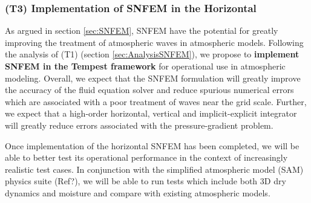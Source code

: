 \documentclass[11pt]{article}
\begin{document}


\subsubsection{(T3) Implementation of SNFEM in the Horizontal} \label{sec:HorizontalSNFEM}

As argued in section \ref{sec:SNFEM}, SNFEM have the potential for greatly improving the treatment of atmospheric waves in atmospheric models.  Following the analysis of (T1) (section \ref{sec:AnalysisSNFEM}), we propose to \textbf{implement SNFEM in the Tempest framework} for operational use in atmospheric modeling.  Overall, we expect that the SNFEM formulation will greatly improve the accuracy of the fluid equation solver and reduce spurious numerical errors which are associated with a poor treatment of waves near the grid scale.  Further, we expect that a high-order horizontal, vertical and implicit-explicit integrator will greatly reduce errors associated with the pressure-gradient problem.

Once implementation of the horizontal SNFEM has been completed, we will be able to better test its operational performance in the context of increasingly realistic test cases.  In conjunction with the simplified atmospheric model (SAM) physics suite {\color{red}(Ref?)}, we will be able to run tests which include both 3D dry dynamics and moisture and compare with existing atmospheric models.
\end{document}
